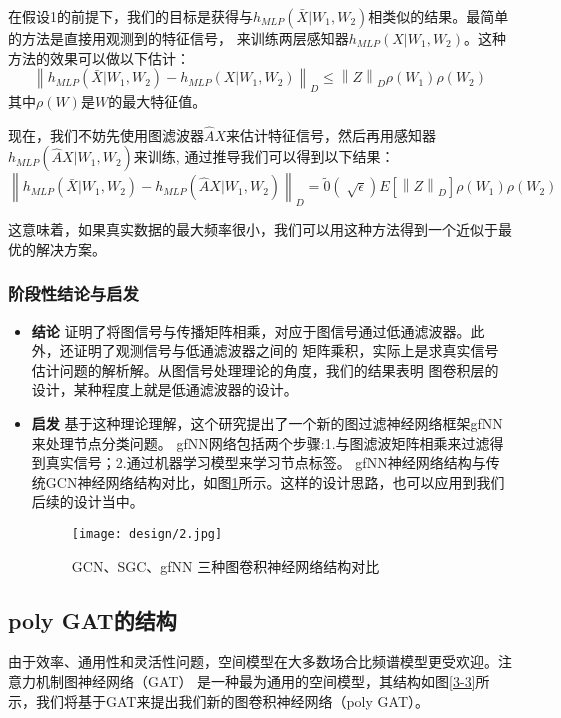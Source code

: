 在假设1的前提下，我们的目标是获得与$ h_{MLP}(\bar{X}|W_1,W_2) $相类似的结果。最简单的方法是直接用观测到的特征信号，
来训练两层感知器$ h_{MLP}(X|W_1,W_2) $。这种方法的效果可以做以下估计：
$$  \left \| h_{MLP}(\bar{X}|W_1,W_2) - h_{MLP}(X|W_1,W_2) \right \|_{D}  \le  \left \| Z \right \|_{D} \rho(W_{1}) \rho(W_{2}) $$
其中$ \rho(W) $是$W$的最大特征值。

现在，我们不妨先使用图滤波器$ \hat{A}X $来估计特征信号，然后再用感知器$ h_{MLP}(\hat{A}X|W_1,W_2) $来训练,
通过推导我们可以得到以下结果：
$$  \left \| h_{MLP}(\bar{X}|W_1,W_2) - h_{MLP}(\hat{A}X|W_1,W_2) \right \|_{D}  =  \tilde{0}(\sqrt[]{\epsilon }) E[\left \| Z \right \|_{D}] \rho(W_{1}) \rho(W_{2}) $$

这意味着，如果真实数据的最大频率很小，我们可以用这种方法得到一个近似于最优的解决方案。

\subsubsection{阶段性结论与启发}
\begin{itemize}
    \item \textbf{结论} \quad
    证明了将图信号与传播矩阵相乘，对应于图信号通过低通滤波器。此外，还证明了观测信号与低通滤波器之间的
    矩阵乘积，实际上是求真实信号估计问题的解析解。从图信号处理理论的角度，我们的结果表明
    图卷积层的设计，某种程度上就是低通滤波器的设计。
    
    \item \textbf{启发} \quad
    基于这种理论理解，这个研究提出了一个新的图过滤神经网络框架gfNN来处理节点分类问题。
    gfNN网络包括两个步骤:1.与图滤波矩阵相乘来过滤得到真实信号；2.通过机器学习模型来学习节点标签。
    gfNN神经网络结构与传统GCN神经网络结构对比，如图\ref{3-2}所示。这样的设计思路，也可以应用到我们后续的设计当中。
    \begin{figure}[ht]
        \centering
        \captionsetup{width=10cm}
        \texttt{[image: design/2.jpg]}
        \caption{\label{3-2}GCN、SGC、gfNN 三种图卷积神经网络结构对比}
    \end{figure}
\end{itemize}

\subsection{poly GAT的结构}
由于效率、通用性和灵活性问题，空间模型在大多数场合比频谱模型更受欢迎。注意力机制图神经网络（GAT）
是一种最为通用的空间模型，其结构如图\ref{3-3}所示，我们将基于GAT来提出我们新的图卷积神经网络（poly GAT）。

